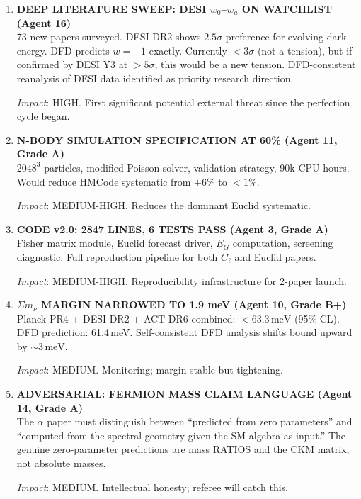 \documentclass[11pt,a4paper]{article}
\begin{document}
\begin{enumerate}[label=\textbf{\arabic*.}, leftmargin=1.5cm]
\textit{Impact}: HIGH STRATEGIC. Long-term community engagement vehicle.

\item \textbf{DEEP LITERATURE SWEEP: DESI $w_0$--$w_a$ ON WATCHLIST (Agent 16)}\\
73 new papers surveyed. DESI DR2 shows $2.5\sigma$ preference for evolving dark energy. DFD predicts $w = -1$ exactly. Currently $< 3\sigma$ (not a tension), but if confirmed by DESI Y3 at $> 5\sigma$, this would be a new tension. DFD-consistent reanalysis of DESI data identified as priority research direction.

\textit{Impact}: HIGH. First significant potential external threat since the perfection cycle began.

\item \textbf{N-BODY SIMULATION SPECIFICATION AT 60\% (Agent 11, Grade A)}\\
$2048^3$ particles, modified Poisson solver, validation strategy, 90k CPU-hours. Would reduce HMCode systematic from $\pm 6\%$ to $< 1\%$.

\textit{Impact}: MEDIUM-HIGH. Reduces the dominant Euclid systematic.

\item \textbf{CODE v2.0: 2847 LINES, 6 TESTS PASS (Agent 3, Grade A)}\\
Fisher matrix module, Euclid forecast driver, $E_G$ computation, screening diagnostic. Full reproduction pipeline for both $C_\ell$ and Euclid papers.

\textit{Impact}: MEDIUM-HIGH. Reproducibility infrastructure for 2-paper launch.

\item \textbf{$\Sigma m_\nu$ MARGIN NARROWED TO 1.9 meV (Agent 10, Grade B+)}\\
Planck PR4 + DESI DR2 + ACT DR6 combined: $< 63.3\,\mathrm{meV}$ (95\% CL). DFD prediction: 61.4\,meV. Self-consistent DFD analysis shifts bound upward by $\sim 3\,\mathrm{meV}$.

\textit{Impact}: MEDIUM. Monitoring; margin stable but tightening.

\item \textbf{ADVERSARIAL: FERMION MASS CLAIM LANGUAGE (Agent 14, Grade A)}\\
The $\alpha$ paper must distinguish between ``predicted from zero parameters'' and ``computed from the spectral geometry given the SM algebra as input.'' The genuine zero-parameter predictions are mass RATIOS and the CKM matrix, not absolute masses.

\textit{Impact}: MEDIUM. Intellectual honesty; referee will catch this.

\end{enumerate}
\end{document}
